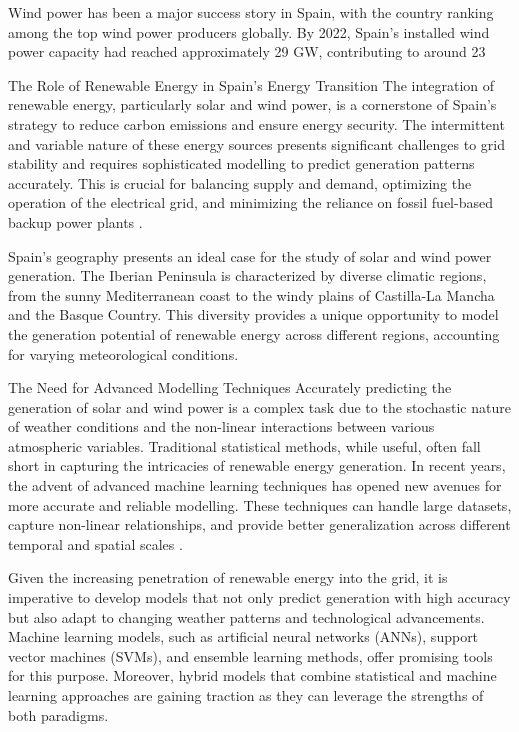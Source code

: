 Wind power has been a major success story in Spain, with the country ranking among the top wind power producers globally. By 2022, Spain's installed wind power capacity had reached approximately 29 GW, contributing to around 23%

The Role of Renewable Energy in Spain’s Energy Transition
The integration of renewable energy, particularly solar and wind power, is a cornerstone of Spain's strategy to reduce carbon emissions and ensure energy security. The intermittent and variable nature of these energy sources presents significant challenges to grid stability and requires sophisticated modelling to predict generation patterns accurately. This is crucial for balancing supply and demand, optimizing the operation of the electrical grid, and minimizing the reliance on fossil fuel-based backup power plants .

Spain's geography presents an ideal case for the study of solar and wind power generation. The Iberian Peninsula is characterized by diverse climatic regions, from the sunny Mediterranean coast to the windy plains of Castilla-La Mancha and the Basque Country. This diversity provides a unique opportunity to model the generation potential of renewable energy across different regions, accounting for varying meteorological conditions.

The Need for Advanced Modelling Techniques
Accurately predicting the generation of solar and wind power is a complex task due to the stochastic nature of weather conditions and the non-linear interactions between various atmospheric variables. Traditional statistical methods, while useful, often fall short in capturing the intricacies of renewable energy generation. In recent years, the advent of advanced machine learning techniques has opened new avenues for more accurate and reliable modelling. These techniques can handle large datasets, capture non-linear relationships, and provide better generalization across different temporal and spatial scales .

Given the increasing penetration of renewable energy into the grid, it is imperative to develop models that not only predict generation with high accuracy but also adapt to changing weather patterns and technological advancements. Machine learning models, such as artificial neural networks (ANNs), support vector machines (SVMs), and ensemble learning methods, offer promising tools for this purpose. Moreover, hybrid models that combine statistical and machine learning approaches are gaining traction as they can leverage the strengths of both paradigms.

